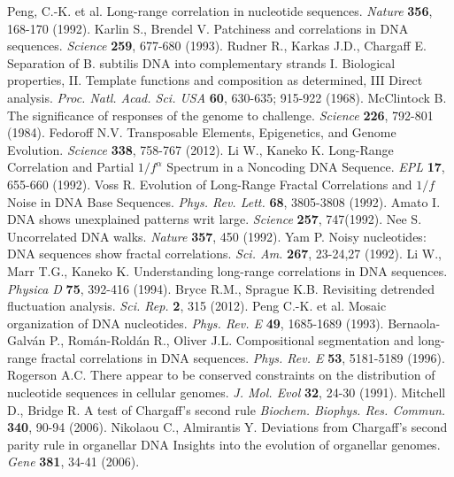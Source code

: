 \documentclass[fleqn,10pt]{wlscirep}
\begin{document}
\begin{thebibliography}{99}
 Peng, C.-K. {et al.}  Long-range correlation in nucleotide sequences. {\it Nature} {\bf 356}, 168-170 (1992).
 Karlin S., Brendel V.   Patchiness and correlations in DNA sequences. {\it Science} {\bf 259}, 677-680 (1993).
  Rudner R.,  Karkas J.D.,  Chargaff E. Separation of B. subtilis DNA into complementary strands I. Biological properties, II. Template functions and composition as determined, III Direct analysis. {\it Proc. Natl. Acad. Sci. USA} {\bf 60}, 630-635; 915-922 (1968). 
 McClintock B.  The significance of responses of the genome to challenge. {\it Science} {\bf 226}, 792-801 (1984).
  Fedoroff N.V.  Transposable Elements, Epigenetics, and Genome Evolution. {\it Science} {\bf 338}, 758-767 (2012).
  Li W., Kaneko K.  Long-Range Correlation and Partial $1/f^{\alpha}$ Spectrum in a Noncoding DNA Sequence. {\it EPL} {\bf 17}, 655-660 (1992).
 Voss R.  Evolution of Long-Range Fractal Correlations and $1/f$ Noise in DNA Base Sequences. {\it Phys. Rev. Lett.} {\bf 68}, 3805-3808  (1992).
  Amato I.  DNA shows unexplained patterns writ large. {\it Science} {\bf 257}, 747(1992).
  Nee S.  Uncorrelated DNA walks. {\it Nature} {\bf  357}, 450 (1992).
 Yam P.  Noisy nucleotides: DNA sequences show fractal correlations.  {\it Sci. Am.} {\bf 267}, 23-24,27 (1992).
  Li W., Marr T.G.,  Kaneko K.  Understanding long-range correlations in DNA sequences. {\it Physica D} {\bf 75}, 392-416 (1994).
 Bryce R.M.,  Sprague K.B.  Revisiting detrended fluctuation analysis. {\it Sci. Rep.} {\bf 2}, 315 (2012).
 Peng C.-K. et al.  Mosaic organization of DNA nucleotides. {\it Phys. Rev. E}  {\bf 49}, 1685-1689 (1993).
 Bernaola-Galv\'an P., Rom\'an-Rold\'an R.,  Oliver J.L.  Compositional segmentation and long-range fractal correlations in DNA sequences. {\it Phys. Rev. E}  {\bf 53}, 5181-5189  (1996).
 Rogerson A.C. There appear to be conserved constraints on the distribution of nucleotide sequences in cellular genomes. {\it  J. Mol. Evol} {\bf 32}, 24-30 (1991). 
 Mitchell D., Bridge R.  A test of Chargaff's  second rule  {\it Biochem. Biophys. Res. Commun.} {\bf 340}, 90-94  (2006).
 Nikolaou C.,  Almirantis  Y.  Deviations from Chargaff's second parity rule in organellar DNA Insights into the evolution of organellar genomes. {\it Gene} {\bf 381}, 34-41 (2006).

\end{thebibliography}
\end{document}
